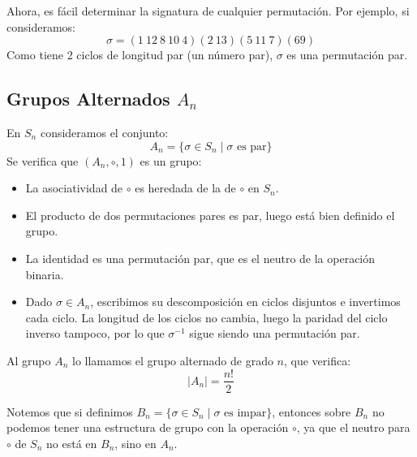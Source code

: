 \begin{ejemplo}
    Ahora, es fácil determinar la signatura de cualquier permutación. Por ejemplo, si consideramos:
    \begin{equation*}
        \sigma = (1\ 12\ 8\ 10\ 4)(2\ 13)(5\ 11\ 7)(6 9)
    \end{equation*}
    Como tiene 2 ciclos de longitud par (un número par), $\sigma$ es una permutación par.
\end{ejemplo}

\subsection{Grupos Alternados $A_n$}
\begin{definicion}
    En $S_n$ consideramos el conjunto:
    \begin{equation*}
        A_n = \{\sigma\in S_n \mid \sigma \text{\ es par}\}
    \end{equation*}
    Se verifica que $(A_n,\circ,1)$ es un grupo:
    \begin{itemize}
        \item La asociatividad de $\circ$ es heredada de la de $\circ$ en $S_n$.
        \item El producto de dos permutaciones pares es par, luego está bien definido el grupo.
        \item La identidad es una permutación par, que es el neutro de la operación binaria.
        \item Dado $\sigma\in A_n$, escribimos su descomposición en ciclos disjuntos e invertimos cada ciclo. La longitud de los ciclos no cambia, luego la paridad del ciclo inverso tampoco, por lo que $\sigma^{-1}$ sigue siendo una permutación par.
    \end{itemize}
    Al grupo $A_n$ lo llamamos el grupo alternado de grado $n$, que verifica:
    \begin{equation*}
        |A_n| = \dfrac{n!}{2}
    \end{equation*}
\end{definicion}


\begin{observacion}
    Notemos que si definimos $B_n = \{\sigma\in S_n \mid \sigma \text{\ es impar}\}$, entonces sobre $B_n$ no podemos tener una estructura de grupo con la operación $\circ$, ya que el neutro para $\circ$ de $S_n$ no está en $B_n$, sino en $A_n$.
\end{observacion}

